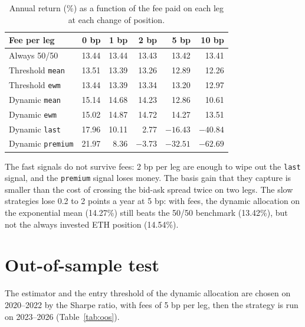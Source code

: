 \documentclass[11pt,a4paper]{article}
\newcommand{\code}[1]{\texttt{#1}}
\begin{document}
\begin{table}[h]
\centering
\small
\begin{tabular}{@{}lrrrrr@{}}
\toprule
\textbf{Fee per leg} & \textbf{0 bp} & \textbf{1 bp} & \textbf{2 bp} & \textbf{5 bp} & \textbf{10 bp} \\
\midrule
Always 50/50 & 13.44 & 13.44 & 13.43 & 13.42 & 13.41 \\
Threshold \code{mean} & 13.51 & 13.39 & 13.26 & 12.89 & 12.26 \\
Threshold \code{ewm} & 13.44 & 13.39 & 13.34 & 13.20 & 12.97 \\
Dynamic \code{mean} & 15.14 & 14.68 & 14.23 & 12.86 & 10.61 \\
Dynamic \code{ewm} & 15.02 & 14.87 & 14.72 & 14.27 & 13.51 \\
Dynamic \code{last} & 17.96 & 10.11 & 2.77 & $-16.43$ & $-40.84$ \\
Dynamic \code{premium} & 21.97 & 8.36 & $-3.73$ & $-32.51$ & $-62.69$ \\
\bottomrule
\end{tabular}
\caption{Annual return (\%) as a function of the fee paid on each leg at each change of position.}
\label{tab:fees}
\end{table}

The fast signals do not survive fees: 2 bp per leg are enough to wipe out the \code{last} signal, and the
\code{premium} signal loses money. The basis gain that they capture is smaller than the cost of crossing the
bid-ask spread twice on two legs. The slow strategies lose 0.2 to 2 points a year at 5 bp: with fees, the dynamic
allocation on the exponential mean (14.27\%) still beats the 50/50 benchmark (13.42\%), but not the always invested ETH
position (14.54\%).

\section{Out-of-sample test}\label{sec:oos}
The estimator and the entry threshold of the dynamic allocation are chosen on 2020--2022 by the Sharpe ratio, with
fees of 5 bp per leg, then the strategy is run on 2023--2026 (Table~\ref{tab:oos}).
\end{document}
